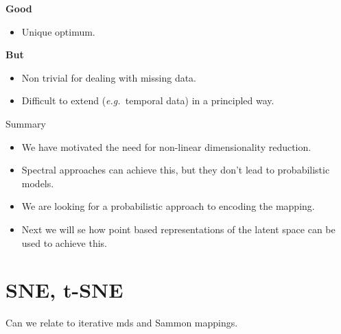 \textbf{Good}
\begin{itemize}
\item Unique optimum.
\end{itemize}
\textbf{But}
\begin{itemize}
\item Non trivial for dealing with missing data.
\item Difficult to extend (\emph{e.g.\ }temporal data) in a principled
  way. 
\end{itemize}
Summary
\begin{itemize}
\item We have motivated the need for non-linear dimensionality reduction.
\item Spectral approaches can achieve this, but they don't lead to probabilistic
  models.
\item We are looking for a probabilistic approach to encoding the mapping.
\item Next we will se how point based representations of the latent space
  can be used to achieve this.
\end{itemize}


\section{SNE, t-SNE}

Can we relate to iterative mds and Sammon mappings.


